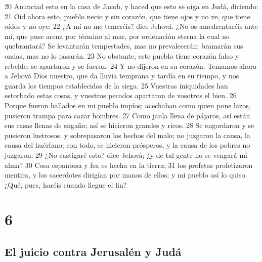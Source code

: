 20 Anunciad esto en la casa de Jacob, y haced que esto se oiga en Judá, diciendo:
21 Oíd ahora esto, pueblo necio y sin corazón, que tiene ojos y no ve, que tiene oídos y no oye: 
22 ¿A mí no me temeréis? dice Jehová. ¿No os amedrentaréis ante mí, que puse arena por término al mar, por ordenación eterna la cual no quebrantará? Se levantarán tempestades, mas no prevalecerán; bramarán sus ondas, mas no lo pasarán.
23 No obstante, este pueblo tiene corazón falso y rebelde; se apartaron y se fueron.
24 Y no dijeron en su corazón: Temamos ahora a Jehová Dios nuestro, que da lluvia temprana y tardía en su tiempo, y nos guarda los tiempos establecidos de la siega.
25 Vuestras iniquidades han estorbado estas cosas, y vuestros pecados apartaron de vosotros el bien.
26 Porque fueron hallados en mi pueblo impíos; acechaban como quien pone lazos, pusieron trampa para cazar hombres.
27 Como jaula llena de pájaros, así están sus casas llenas de engaño; así se hicieron grandes y ricos.
28 Se engordaron y se pusieron lustrosos, y sobrepasaron los hechos del malo; no juzgaron la causa, la causa del huérfano; con todo, se hicieron prósperos, y la causa de los pobres no juzgaron.
29 ¿No castigaré esto? dice Jehová; ¿y de tal gente no se vengará mi alma?
30 Cosa espantosa y fea es hecha en la tierra;
31 los profetas profetizaron mentira, y los sacerdotes dirigían por manos de ellos; y mi pueblo así lo quiso. ¿Qué, pues, haréis cuando llegue el fin?

\chapter{6}

\section*{El juicio contra Jerusalén y Judá}

